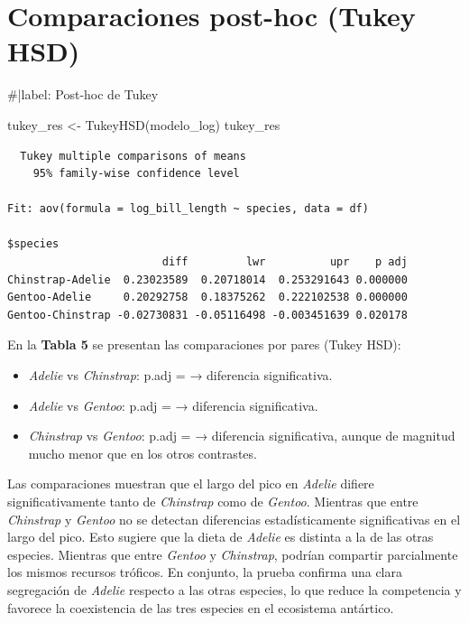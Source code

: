 \documentclass[
  spanish,
  11pt,
  a4paper,
  DIV=11,
  numbers=noendperiod]{scrartcl}
\newenvironment{Shaded}{\begin{snugshade}}{\end{snugshade}}
\newcommand{\CommentTok}[1]{\textcolor[rgb]{0.37,0.37,0.37}{#1}}
\newcommand{\FunctionTok}[1]{\textcolor[rgb]{0.28,0.35,0.67}{#1}}
\newcommand{\NormalTok}[1]{\textcolor[rgb]{0.00,0.23,0.31}{#1}}
\newcommand{\OtherTok}[1]{\textcolor[rgb]{0.00,0.23,0.31}{#1}}
\begin{document}
\section{Comparaciones post-hoc (Tukey
HSD)}\label{comparaciones-post-hoc-tukey-hsd}

\begin{Shaded}
\begin{Highlighting}[numbers=left,,]
\CommentTok{\#|label: Post{-}hoc de Tukey}

\NormalTok{tukey\_res }\OtherTok{\textless{}{-}} \FunctionTok{TukeyHSD}\NormalTok{(modelo\_log)}
\NormalTok{tukey\_res}
\end{Highlighting}
\end{Shaded}

\begin{verbatim}
  Tukey multiple comparisons of means
    95% family-wise confidence level

Fit: aov(formula = log_bill_length ~ species, data = df)

$species
                        diff         lwr          upr    p adj
Chinstrap-Adelie  0.23023589  0.20718014  0.253291643 0.000000
Gentoo-Adelie     0.20292758  0.18375262  0.222102538 0.000000
Gentoo-Chinstrap -0.02730831 -0.05116498 -0.003451639 0.020178
\end{verbatim}

En la \textbf{Tabla 5} se presentan las comparaciones por pares (Tukey
HSD):

\begin{itemize}
\item
  \emph{Adelie} vs \emph{Chinstrap}: p.adj = → diferencia significativa.
\item
  \emph{Adelie} vs \emph{Gentoo}: p.adj = → diferencia significativa.
\item
  \emph{Chinstrap} vs \emph{Gentoo}: p.adj = → diferencia significativa,
  aunque de magnitud mucho menor que en los otros contrastes.
\end{itemize}

Las comparaciones muestran que el largo del pico en \emph{Adelie}
difiere significativamente tanto de \emph{Chinstrap} como de
\emph{Gentoo}. Mientras que entre \emph{Chinstrap} y \emph{Gentoo} no se
detectan diferencias estadísticamente significativas en el largo del
pico. Esto sugiere que la dieta de \emph{Adelie} es distinta a la de las
otras especies. Mientras que entre \emph{Gentoo} y \emph{Chinstrap},
podrían compartir parcialmente los mismos recursos tróficos. En
conjunto, la prueba confirma una clara segregación de \emph{Adelie}
respecto a las otras especies, lo que reduce la competencia y favorece
la coexistencia de las tres especies en el ecosistema antártico.
\end{document}
